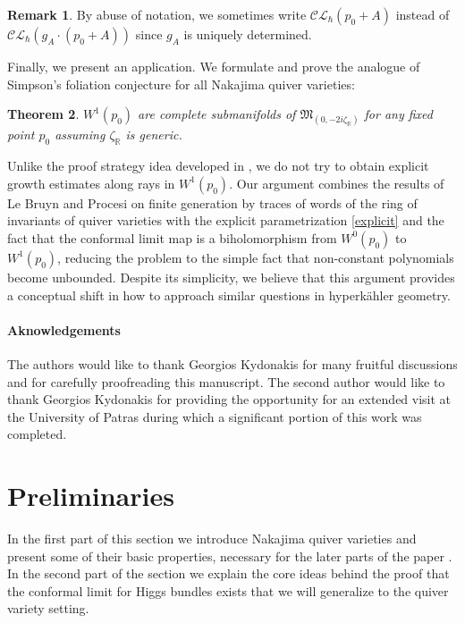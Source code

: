 \documentclass[12pt,oneside,reqno]{amsart}
\newtheorem{theorem}{Theorem}
\theoremstyle{definition}
\newtheorem{remark}[theorem]{Remark}
\numberwithin{equation}{section}
\numberwithin{theorem}{section}
\newcommand{\R}{\mathbb{R}}
\begin{document}
%
%
\begin{remark}
By abuse of notation, we sometimes write $\mathcal {CL}_{\hbar}(p_0+A)$ instead of $\mathcal {CL}_{\hbar}(g_A\cdot(p_0+A))$ since $g_A$ is uniquely determined.
\end{remark}
%
Finally, we present an application. We formulate and prove the analogue of Simpson's foliation conjecture \cite{Simpson} for all Nakajima quiver varieties:
%
\begin{theorem}
$W^1(p_0)$ are complete submanifolds of $\mathfrak M_{(0,-2i\zeta_{\R})}$ for any fixed point $p_0$ assuming $\zeta_{\R}$ is generic. 
\end{theorem}
%
Unlike the proof strategy idea developed in \cite{Schulz,DS}, we do not try to obtain explicit growth estimates along rays in $W^1(p_0)$. Our argument combines the results of Le Bruyn and Procesi \cite{LP1990} on finite generation by traces of words of the ring of invariants of quiver varieties with the explicit parametrization \eqref{explicit} and the fact that the conformal limit map is a biholomorphism from $W^0(p_0)$ to $W^1(p_0)$, reducing the problem to the simple fact that non-constant polynomials become unbounded. Despite its simplicity, we believe that this argument provides a conceptual shift in how to approach similar questions in hyperk\"ahler geometry. 
\\
\paragraph{\textbf{Aknowledgements}} The authors would like to thank Georgios Kydonakis for many fruitful discussions and for carefully proofreading this manuscript. The second author would like to thank Georgios Kydonakis for providing the opportunity for an extended visit at the University of Patras during which a significant portion of this work was completed. 

\section{Preliminaries}

In the first part of this section we introduce Nakajima quiver varieties and present some of their basic properties, necessary for the later parts of the paper \cite{Na1994}. In the second part of the section we explain the core ideas behind the proof that the conformal limit for Higgs bundles exists \cite{CW} that we will generalize to the quiver variety setting.  
\end{document}
